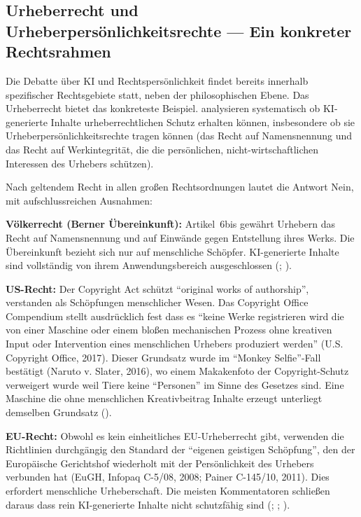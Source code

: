 \documentclass[acmlarge, noacm]{acmart}
\begin{document}
\subsection{Urheberrecht und Urheberpersönlichkeitsrechte --- Ein konkreter Rechtsrahmen}

Die Debatte über KI und Rechtspersönlichkeit findet bereits innerhalb spezifischer Rechtsgebiete statt, neben der philosophischen Ebene. Das Urheberrecht bietet das konkreteste Beispiel. \citet{miernicki2021} analysieren systematisch ob KI-generierte Inhalte urheberrechtlichen Schutz erhalten können, insbesondere ob sie Urheberpersönlichkeitsrechte tragen können (das Recht auf Namensnennung und das Recht auf Werkintegrität, die die persönlichen, nicht-wirtschaftlichen Interessen des Urhebers schützen).

Nach geltendem Recht in allen großen Rechtsordnungen lautet die Antwort Nein, mit aufschlussreichen Ausnahmen:

\textbf{Völkerrecht (Berner Übereinkunft):} Artikel~6bis gewährt Urhebern das Recht auf Namensnennung und auf Einwände gegen Entstellung ihres Werks. Die Übereinkunft bezieht sich nur auf menschliche Schöpfer. KI-generierte Inhalte sind vollständig von ihrem Anwendungsbereich ausgeschlossen (\cite{ginsburg2018}; \cite{ricketson1991}).

\textbf{US-Recht:} Der Copyright Act schützt ``original works of authorship'', verstanden als Schöpfungen menschlicher Wesen. Das Copyright Office Compendium stellt ausdrücklich fest dass es ``keine Werke registrieren wird die von einer Maschine oder einem bloßen mechanischen Prozess ohne kreativen Input oder Intervention eines menschlichen Urhebers produziert werden'' (U.S. Copyright Office, 2017). Dieser Grundsatz wurde im ``Monkey Selfie''-Fall bestätigt (Naruto v. Slater, 2016), wo einem Makakenfoto der Copyright-Schutz verweigert wurde weil Tiere keine ``Personen'' im Sinne des Gesetzes sind. Eine Maschine die ohne menschlichen Kreativbeitrag Inhalte erzeugt unterliegt demselben Grundsatz (\cite{miernicki2021}).

\textbf{EU-Recht:} Obwohl es kein einheitliches EU-Urheberrecht gibt, verwenden die Richtlinien durchgängig den Standard der ``eigenen geistigen Schöpfung'', den der Europäische Gerichtshof wiederholt mit der Persönlichkeit des Urhebers verbunden hat (EuGH, Infopaq C-5/08, 2008; Painer C-145/10, 2011). Dies erfordert menschliche Urheberschaft. Die meisten Kommentatoren schließen daraus dass rein KI-generierte Inhalte nicht schutzfähig sind (\cite{handig2009}; \cite{ihalainen2018}; \cite{miernicki2021}).
\end{document}
